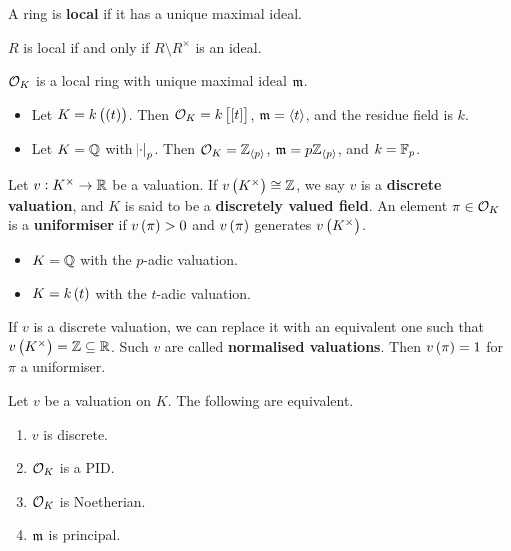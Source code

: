 A ring is \textbf{local} if it has a unique maximal ideal.

\begin{exercise*}
$ R $ is local if and only if $ R \setminus R^\times $ is an ideal.
\end{exercise*}

\begin{corollary}
$ \mathcal{O}_K $ is a local ring with unique maximal ideal $ \mathfrak{m} $.
\end{corollary}

\begin{example*}
\hfill
\begin{itemize}
\item Let $ K = k\br{\br{t}} $. Then $ \OOO_K = k\sbr{\sbr{t}} $, $ \mathfrak{m} = \left\langle t \right\rangle $, and the residue field is $ k $.
\item Let $ K = \mathbb{Q} $ with $ \abs{\cdot}_p $. Then $ \mathcal{O}_K = \mathbb{Z}_{\left\langle p \right\rangle} $, $ \mathfrak{m} = p\mathbb{Z}_{\left\langle p \right\rangle} $, and $ k = \mathbb{F}_p $.
\end{itemize}
\end{example*}

\begin{definition}
Let $ v : K^\times \to \mathbb{R} $ be a valuation. If $ v\br{K^\times} \cong \ZZ $, we say $ v $ is a \textbf{discrete valuation}, and $ K $ is said to be a \textbf{discretely valued field}. An element $ \pi \in \mathcal{O}_K $ is a \textbf{uniformiser} if $ v\br{\pi} > 0 $ and $ v\br{\pi} $ generates $ v\br{K^\times} $.
\end{definition}

\begin{example*}
\hfill
\begin{itemize}
\item $ K = \mathbb{Q} $ with the $ p $-adic valuation.
\item $ K = k\br{t} $ with the $ t $-adic valuation.
\end{itemize}
\end{example*}

\pagebreak

\begin{remark*}
If $ v $ is a discrete valuation, we can replace it with an equivalent one such that $ v\br{K^\times} = \ZZ \subseteq \RR $. Such $ v $ are called \textbf{normalised valuations}. Then $ v\br{\pi} = 1 $ for $ \pi $ a uniformiser.
\end{remark*}

\begin{lemma}
\label{lem:2.6}
Let $ v $ be a valuation on $ K $. The following are equivalent.
\begin{enumerate}
\item $ v $ is discrete.
\item $ \mathcal{O}_K $ is a PID.
\item $ \mathcal{O}_K $ is Noetherian.
\item $ \mathfrak{m} $ is principal.
\end{enumerate}
\end{lemma}

